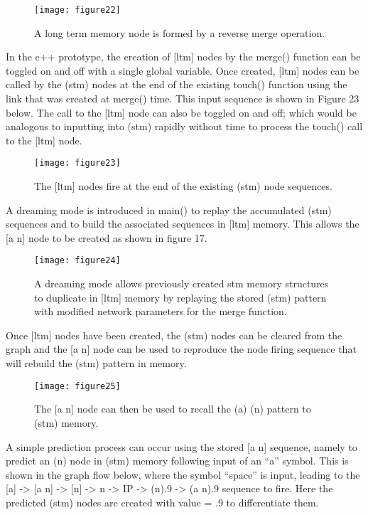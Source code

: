 \documentclass{clv3}
\begin{document}
\begin{figure}[H]
\texttt{[image: figure22]}
\caption{A long term memory node is formed by a reverse merge operation.  }
\end{figure}

In the c++ prototype, the creation of [ltm] nodes by the merge() function can be toggled on and off with a single global variable.   Once created, [ltm] nodes can be called by the (stm) nodes at the end of the existing touch() function using the  link that was created at merge() time.   This input sequence is shown in Figure 23 below.  The call to the [ltm] node can also be toggled on and off;  which would be analogous to inputting  into (stm) rapidly without time to process the touch() call to the [ltm] node. 



\begin{figure}[H]
\texttt{[image: figure23]}
\caption{The [ltm] nodes fire at the end of the existing (stm) node sequences. }
\end{figure}


A dreaming mode is introduced in main() to replay the accumulated (stm) sequences and to build the associated sequences in [ltm] memory.   This allows the [a n] node to be created as shown in figure 17. 




\begin{figure}[H]
\texttt{[image: figure24]}
\caption{A dreaming mode allows previously created  stm memory structures to duplicate in [ltm] memory by replaying the stored (stm) pattern with modified network parameters for the merge function. }
\end{figure}


Once [ltm] nodes have been created, the (stm) nodes can be cleared from the graph and the [a n] node can be used to reproduce the node firing sequence that will rebuild the (stm) pattern in memory.

\begin{figure}[H]
\texttt{[image: figure25]}
\caption{The [a n] node can then be used to recall the (a) (n) pattern to (stm) memory. }
\end{figure}



A simple prediction process can occur using the stored [a n] sequence, namely to predict an (n) node in (stm) memory following input of an ``a'' symbol.   This is shown in the graph flow below, where the symbol ``space'' is input, leading to the [a] -> [a n] -> [n] -> n -> IP -> (n).9 -> (a n).9 sequence to fire.  Here the predicted (stm) nodes are created with value = .9 to differentiate them.
\end{document}
